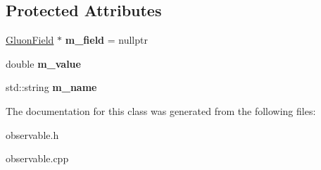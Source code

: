 \subsection*{Protected Attributes}
\begin{DoxyCompactItemize}
\item 
\hyperlink{classField}{Gluon\+Field} $\ast$ {\bfseries m\+\_\+field} = nullptr\hypertarget{classObservable_a3f3b97a6ccf3662fc4285e0249fc7e55}{}\label{classObservable_a3f3b97a6ccf3662fc4285e0249fc7e55}

\item 
double {\bfseries m\+\_\+value}\hypertarget{classObservable_a65689c61e83937902110f9da43b4a327}{}\label{classObservable_a65689c61e83937902110f9da43b4a327}

\item 
std\+::string {\bfseries m\+\_\+name}\hypertarget{classObservable_ac48d8fce3be9fefa7af3bb3cd4e01e06}{}\label{classObservable_ac48d8fce3be9fefa7af3bb3cd4e01e06}

\end{DoxyCompactItemize}


The documentation for this class was generated from the following files\+:\begin{DoxyCompactItemize}
\item 
observable.\+h\item 
observable.\+cpp\end{DoxyCompactItemize}
